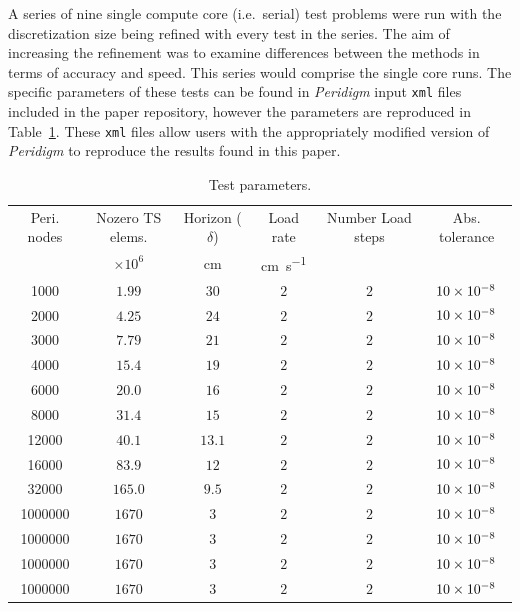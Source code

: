 \documentclass[preprint,12pt]{elsarticle}
\begin{document}
A series of nine single compute core (i.e.\ serial) test problems were run with the discretization size being refined with every test in the series. The aim of increasing the refinement was to examine differences between the methods in terms of accuracy and speed. This series would comprise the single core runs.   The specific parameters of these tests can be found in \emph{Peridigm} input {\tt xml} files included in the paper repository, however the parameters are reproduced in Table~\ref{tab:TestParams}. These {\tt xml} files allow users with the appropriately modified version of \emph{Peridigm} to reproduce the results found in this paper.
%
\begin{table}[!tbp]    
  \scriptsize
  \centering
  \caption{Test parameters.} \label{tab:TestParams}   
       \begin{tabular}{c c c c c c}
         \toprule
         Peri. nodes & Nozero TS elems. & Horizon ($\delta$) & Load rate & Number Load steps & Abs. tolerance \\ 
                     & $\times 10^6$    & \si{\centi\meter}& \si{\centi\meter\per\second} &   &     \\
        \midrule
        1000 & $1.99$             & $30$   & $2$ & $2$ & $\num{10E-8}$ \\
        2000 & $4.25$             & $24$  & $2$ & $2$ & $\num{10E-8}$ \\
        3000 & $7.79$             & $21$  & $2$ & $2$ & $\num{10E-8}$ \\
        4000 & $15.4$             & $19$  & $2$ & $2$ & $\num{10E-8}$ \\
        6000 & $20.0$             & $16$  & $2$ & $2$ & $\num{10E-8}$ \\
        8000 & $31.4$             & $15$  & $2$ & $2$ & $\num{10E-8}$ \\
        12000 & $40.1$            & $13.1$ & $2$ & $2$ & $\num{10E-8}$ \\
        16000 & $83.9$            & $12$  & $2$ & $2$ & $\num{10E-8}$ \\
        32000 & $165.0$           & $9.5$ & $2$ & $2$ & $\num{10E-8}$ \\
        1000000 & $1670$          & $3$  & $2$ & $2$ & $\num{10E-8}$ \\
        1000000 & $1670$          & $3$  & $2$ & $2$ & $\num{10E-8}$ \\
        1000000 & $1670$          & $3$  & $2$ & $2$ & $\num{10E-8}$ \\
        1000000 & $1670$          & $3$  & $2$ & $2$ & $\num{10E-8}$ \\
        \bottomrule
    \end{tabular}
\end{table}
\end{document}
